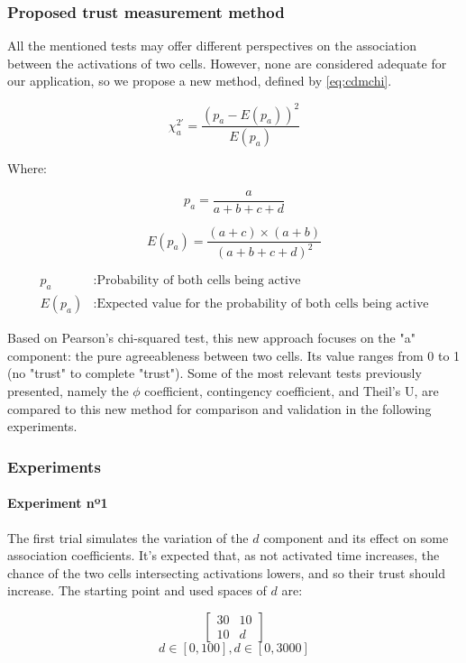 \subsubsection{Proposed trust measurement method}

All the mentioned tests may offer different perspectives on the association between the activations of two cells. However, none are considered adequate for our application, so we propose a new method, defined by \ref{eq:cdmchi}.

\begin{equation} \label{eq:cdmchi}
    \chi_a^{2'} = \frac{(p_a - E(p_a))^2}{E(p_a)}
\end{equation}

Where:

\[
    p_a = \frac{a}{a+b+c+d}
\]

\[
    E(p_a) = \frac{(a + c) \times (a + b)}{(a+b+c+d)^2}
\]

\begin{align*}
    p_a &: \text{Probability of both cells being active} \\
    E(p_a) &: \text{Expected value for the probability of both cells being active}
\end{align*}

Based on Pearson's chi-squared test, this new approach focuses on the "a" component: the pure agreeableness between two cells. Its value ranges from 0 to 1 (no "trust" to complete "trust"). Some of the most relevant tests previously presented, namely the $\phi$ coefficient, contingency coefficient, and Theil's U, are compared to this new method for comparison and validation in the following experiments.

\subsubsection{Experiments}

\paragraph{Experiment nº1}

The first trial simulates the variation of the $d$ component and its effect on some association coefficients. It's expected that, as not activated time increases, the chance of the two cells intersecting activations lowers, and so their trust should increase. The starting point and used spaces of $d$ are:

$$
\begin{bmatrix}
    30 & 10 \\ 10 & d
\end{bmatrix}
$$
$$
d \in [0, 100], d \in [0, 3000]
$$

